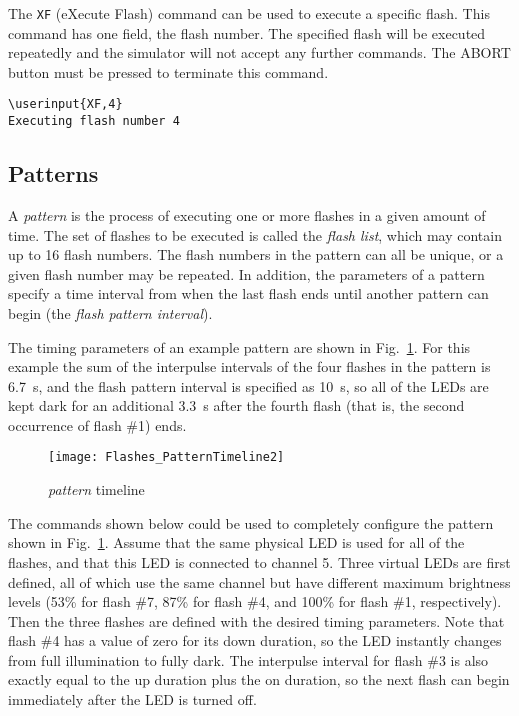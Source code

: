 \documentclass[letterpaper,11pt]{article}
\newcommand\userinput[1]{\textbf{#1}}
\begin{document}
The \texttt{XF} (eXecute Flash) command can be used to execute a specific
flash.  This command has one field, the flash number. The specified flash
will be executed repeatedly and the simulator will not accept any further
commands. The \textsf{ABORT} button must be pressed to terminate this command.

\begin{tcolorbox}
\begin{Verbatim}[commandchars=\\\{\}]
\userinput{XF,4}
Executing flash number 4
\end{Verbatim}
\end{tcolorbox}

\subsection*{Patterns}

A \textit{pattern} is the process of executing one or more flashes in a
given amount of time. The set of flashes to be executed is called the
\textit{flash list}, which may contain up to 16 flash numbers. The flash
numbers in the pattern can all be unique, or a given flash number may be
repeated. In addition, the parameters of a pattern specify a time interval
from when the last flash ends until another pattern can begin (the
\textit{flash pattern interval}).

The timing parameters of an example pattern are shown in
Fig.\ \ref{fig:FlashPattern}. For this example the sum of the interpulse
intervals of the four flashes in the pattern is \SI{6.7}{\second}, and the
flash pattern interval is specified as \SI{10}{\second}, so all of the LEDs are
kept dark for an additional \SI{3.3}{\second} after the fourth flash (that is,
the second occurrence of flash \#1) ends.

\begin{figure}[h]
  \begin{center}
    \texttt{[image: Flashes\_PatternTimeline2]}
  \end{center}
  \vspace{-18pt}
  \caption{\textit{pattern} timeline}
  \label{fig:FlashPattern}
\end{figure}

The commands shown below could be used to completely configure the pattern
shown in Fig.\ \ref{fig:FlashPattern}. Assume that the same physical LED is
used for all of the flashes, and that this LED is connected to channel 5. Three
virtual LEDs are first defined, all of which use the same channel but have
different maximum brightness levels (53\% for flash \#7, 87\% for flash \#4,
and 100\% for flash \#1, respectively).
Then the three flashes are defined with the desired timing parameters. Note
that flash \#4 has a value of zero for its down duration, so the LED instantly
changes from full illumination to fully dark. The interpulse interval for flash
\#3 is also exactly equal to the up duration plus the on duration, so the next
flash can begin immediately after the LED is turned off.
\end{document}
